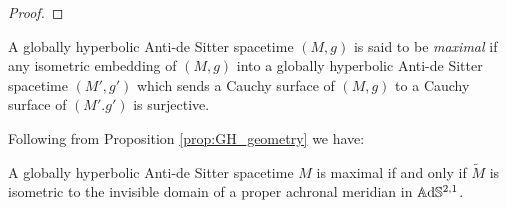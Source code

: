 \begin{proof}
\end{proof}
\begin{definition}
    A globally hyperbolic Anti-de Sitter spacetime $(M,g)$ is said to be \textit{maximal} if any isometric embedding of $(M,g)$ into a globally hyperbolic Anti-de Sitter spacetime $(M',g')$ which sends a Cauchy surface of $(M,g)$ to a Cauchy surface of $(M'.g')$ is surjective.
\end{definition}
Following from Proposition \ref{prop:GH_geometry} we have:
\begin{corollary}
    A globally hyperbolic Anti-de Sitter spacetime $M$ is maximal if and only if $\widetilde{M}$ is isometric to the invisible domain of a proper achronal meridian in $\mathbb{A}\mathrm{d}\mathbb{S}^{2,1}$.
\end{corollary}

